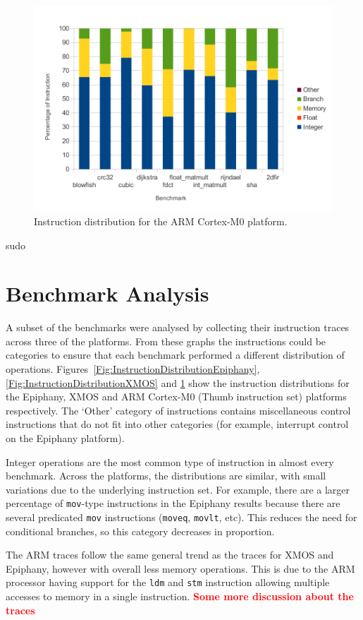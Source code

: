 \documentclass[twocolumn]{article}
\newcommand{\nsection}[1]{\section{\bfseries #1}}
\newcommand{\todo}[1]{\textbf{\textcolor{red}{#1}}}
\begin{document}
\begin{figure}[t]
	\includegraphics[width=\linewidth]{arm.pdf}
	\caption{Instruction distribution for the ARM Cortex-M0 platform.}
	\label{Fig:InstructionDistributionARM}
\end{figure}
sudo

\nsection{Benchmark Analysis}

A subset of the benchmarks were analysed by collecting their instruction traces across three of the platforms. From these graphs the instructions could be categories to ensure that each benchmark performed a different distribution of operations. Figures~\ref{Fig:InstructionDistributionEpiphany}, \ref{Fig:InstructionDistributionXMOS} and \ref{Fig:InstructionDistributionARM} show the instruction distributions for the Epiphany, XMOS and ARM Cortex-M0 (Thumb instruction set) platforms respectively. The `Other' category of instructions contains miscellaneous control instructions that do not fit into other categories (for example, interrupt control on the Epiphany platform).

Integer operations are the most common type of instruction in almost every benchmark. Across the platforms, the distributions are similar, with small variations due to the underlying instruction set. For example, there are a larger percentage of \texttt{mov}-type instructions in the Epiphany results because there are several predicated \texttt{mov} instructions (\texttt{moveq}, \texttt{movlt}, etc). This reduces the need for conditional branches, so this category decreases in proportion.

The ARM traces follow the same general trend as the traces for XMOS and Epiphany, however with overall less memory operations. This is due to the ARM processor having support for the \texttt{ldm} and \texttt{stm} instruction allowing multiple accesses to memory in a single instruction.
\todo{Some more discussion about the traces}
\end{document}
